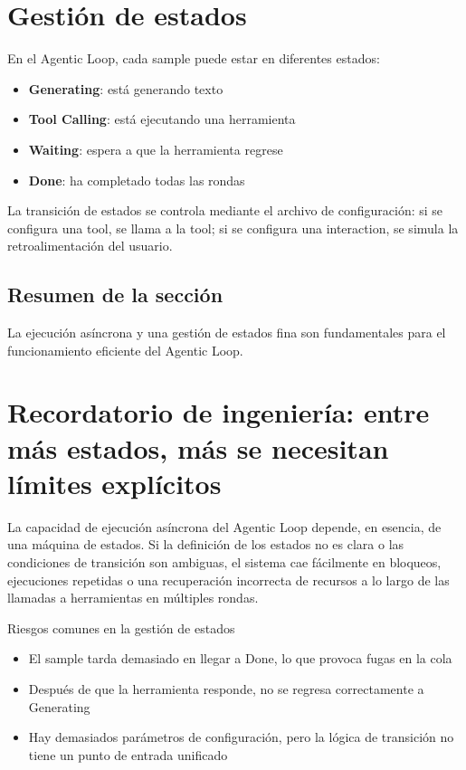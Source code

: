 \documentclass[a4paper]{article}
\begin{document}
\section{Gestión de estados}
En el Agentic Loop, cada sample puede estar en diferentes estados:
\begin{itemize}
  \item \textbf{Generating}: está generando texto
  \item \textbf{Tool Calling}: está ejecutando una herramienta
  \item \textbf{Waiting}: espera a que la herramienta regrese
  \item \textbf{Done}: ha completado todas las rondas
\end{itemize}

La transición de estados se controla mediante el archivo de configuración: si se configura una tool, se llama a la tool; si se configura una interaction, se simula la retroalimentación del usuario.

\subsection{Resumen de la sección}
La ejecución asíncrona y una gestión de estados fina son fundamentales para el funcionamiento eficiente del Agentic Loop.

\newpage
\section{Recordatorio de ingeniería: entre más estados, más se necesitan límites explícitos}
La capacidad de ejecución asíncrona del Agentic Loop depende, en esencia, de una máquina de estados. Si la definición de los estados no es clara o las condiciones de transición son ambiguas, el sistema cae fácilmente en bloqueos, ejecuciones repetidas o una recuperación incorrecta de recursos a lo largo de las llamadas a herramientas en múltiples rondas.

\begin{warningbox}{Riesgos comunes en la gestión de estados}
\begin{itemize}
  \item El sample tarda demasiado en llegar a Done, lo que provoca fugas en la cola
  \item Después de que la herramienta responde, no se regresa correctamente a Generating
  \item Hay demasiados parámetros de configuración, pero la lógica de transición no tiene un punto de entrada unificado
\end{itemize}
\end{warningbox}
\end{document}
